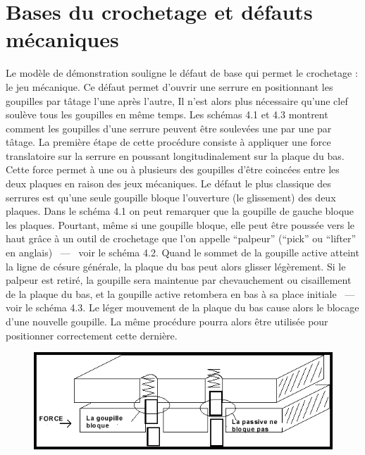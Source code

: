 \documentclass[a4paper,french,11pt,twoside]{report}
\begin{document}
\chapter{Bases du crochetage et défauts mécaniques}

Le modèle de démonstration souligne le défaut de base qui permet le crochetage : le jeu mécanique. Ce défaut permet d'ouvrir une serrure en positionnant les goupilles par tâtage l'une après l'autre, Il n'est alors plus nécessaire qu'une clef soulève tous les goupilles en même temps. Les schémas 4.1 et 4.3 montrent comment les goupilles d'une serrure peuvent être soulevées une par une par tâtage. La première étape de cette procédure consiste à appliquer une force translatoire sur la serrure en poussant longitudinalement sur la plaque du bas. Cette force permet à une ou à plusieurs des goupilles d'être coincées entre les deux plaques en raison des jeux mécaniques. Le défaut le plus classique des serrures est qu'une seule goupille bloque l'ouverture (le glissement) des deux plaques. Dans le schéma 4.1 on peut remarquer que la goupille de gauche bloque les plaques. Pourtant, même si une goupille bloque, elle peut être poussée vers le haut grâce à un outil de crochetage que l'on appelle \enquote{palpeur} (\enquote{pick} ou \enquote{lifter} en anglais) ~---~ voir le schéma 4.2. Quand le sommet de la goupille active atteint la ligne de césure générale, la plaque du bas peut alors glisser légèrement. Si le palpeur est retiré, la goupille sera maintenue par chevauchement ou cisaillement de la plaque du bas, et la goupille active retombera en bas à sa place initiale ~---~ voir le schéma 4.3. Le léger mouvement de la plaque du bas cause alors le blocage d'une nouvelle goupille. La même procédure pourra alors être utilisée pour positionner correctement cette dernière.


\begin{figure}[h] \begin{center}
        \includegraphics[width=16cm]{images/Image6}
        \caption{}
\end{center} \end{figure}
\end{document}
